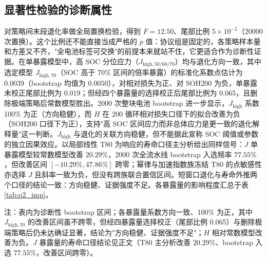 \documentclass[withoutpreface,bwprint]{cumcmthesis}
\begin{document}
\subsection{显著性检验的诊断属性}
对策略间末段退化率做全局置换检验，得到 $F=12.50$、尾部比例 $5\times10^{-5}$（20000 次置换）。这个比例还不能直接当成严格的 $p$ 值：协议组是固定的，各策略样本量和方差又不齐，"全电池标签可交换"的前提本来就站不住，它更适合作为诊断性证据。在单暴露模型中，高 SOC 分位应力（$J_{\mathrm{high},50/60/70}$）均与退化方向一致，其中选定模型 $J_{\mathrm{high},70}$（SOC 高于 70\% 区间的倍率暴露）的标准化系数点估计为 $0.0039$（bootstrap 均值为 $0.0050$），对相对损失为正、对 SOH200 为负，单暴露未校正尾部比例为 $0.019$；但经四个暴露量的选择校正后尾部比例为 $0.065$，且删除极端策略后常数模型胜出。2000 次整块电池 bootstrap 进一步显示，$J_{\mathrm{high}}$ 系数 100\% 为正（方向稳健），而 $H$ 在 200 循环相对损失口径下的拟合改善为负（SOH200 口径下为正），支持"高 SOC 区间应力而非总体应力是更一致的退化解释量"这一判断。$J_{\mathrm{high}}$ 与退化的关联方向稳健，但不能据此宣称 SOC 阈值或参数的独立因果效应。以局部线性 T80 为响应的寿命口径主分析给出同样信号：$J$ 单暴露模型较常数模型改善 $20.29\%$，2000 次全流水线 bootstrap 入选频率 $77.55\%$，但改善区间 $[-10.29\%, 47.86\%]$ 跨零；幂律与加速指数族冻结 T80 的点敏感性亦选择 $J$ 且斜率一致为负，但没有跨族联合置信区间。短窗口退化与寿命外推两个口径的结论一致：方向稳健、证据强度不足。各暴露量的影响程度汇总于表 \ref{tab:q2_imp}。

\begin{table}[H]\centering
\caption{高 SOC 暴露量对 200 循环退化（相对损失）的影响程度（2000 次整块电池 bootstrap）}\label{tab:q2_imp}
\par\footnotesize 注：表内为诊断性 bootstrap 区间；各暴露量系数方向一致、100\% 为正，其中 $J_{\mathrm{high},70}$ 的改善区间虽不跨零，但经四暴露量选择校正（尾部比例 0.065）与删除极端策略后仍未达确证显著，结论为"方向稳健、证据强度不足"；$H$ 相对常数模型改善为负。$J$ 暴露量的寿命口径结论见正文（T80 主分析改善 $20.29\%$、bootstrap 入选 $77.55\%$，改善区间跨零）。
\end{table}
\end{document}
